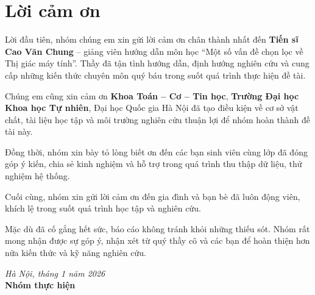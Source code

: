 ﻿\chapter*{Lời cảm ơn}

Lời đầu tiên, nhóm chúng em xin gửi lời cảm ơn chân thành nhất đến \textbf{Tiến sĩ Cao Văn Chung} -- giảng viên hướng dẫn môn học ``Một số vấn đề chọn lọc về Thị giác máy tính''. Thầy đã tận tình hướng dẫn, định hướng nghiên cứu và cung cấp những kiến thức chuyên môn quý báu trong suốt quá trình thực hiện đề tài.

Chúng em cũng xin cảm ơn \textbf{Khoa Toán -- Cơ -- Tin học}, \textbf{Trường Đại học Khoa học Tự nhiên}, Đại học Quốc gia Hà Nội đã tạo điều kiện về cơ sở vật chất, tài liệu học tập và môi trường nghiên cứu thuận lợi để nhóm hoàn thành đề tài này.

Đồng thời, nhóm xin bày tỏ lòng biết ơn đến các bạn sinh viên cùng lớp đã đóng góp ý kiến, chia sẻ kinh nghiệm và hỗ trợ trong quá trình thu thập dữ liệu, thử nghiệm hệ thống.

Cuối cùng, nhóm xin gửi lời cảm ơn đến gia đình và bạn bè đã luôn động viên, khích lệ trong suốt quá trình học tập và nghiên cứu.

Mặc dù đã cố gắng hết sức, báo cáo không tránh khỏi những thiếu sót. Nhóm rất mong nhận được sự góp ý, nhận xét từ quý thầy cô và các bạn để hoàn thiện hơn nữa kiến thức và kỹ năng nghiên cứu.

\vspace{1cm}
\begin{flushright}
\textit{Hà Nội, tháng 1 năm 2026}\\
\textbf{Nhóm thực hiện}
\end{flushright}
